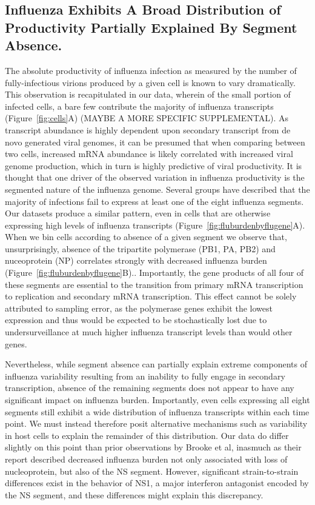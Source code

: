 \documentclass[9pt,lineno]{elife}
\begin{document}
\subsection{Influenza Exhibits A Broad Distribution of Productivity Partially Explained By Segment Absence.}
The absolute productivity of influenza infection as measured by the number of fully-infectious virions produced by a given cell is known to vary dramatically.  This observation is recapitulated in our data, wherein of the small portion of infected cells, a bare few contribute the majority of influenza transcripts (Figure~\ref{fig:cells}A) (MAYBE A MORE SPECIFIC SUPPLEMENTAL). As transcript abundance is highly dependent upon secondary transcript from de novo generated viral genomes, it can be presumed that when comparing between two cells, increased mRNA abundance is likely correlated with increased viral genome production, which in turn is highly predictive of viral productivity. It is thought that one driver of the observed variation in influenza productivity is the segmented nature of the influenza genome. Several groups have described that the majority of infections fail to express at least one of the eight influenza segments. Our datasets produce a similar pattern, even in cells that are otherwise expressing high levels of influenza transcripts (Figure~\ref{fig:fluburdenbyflugene}A). When we bin cells according to absence of a given segment we observe that, unsurprisingly, absence of the tripartite polymerase (PB1, PA, PB2) and nuceoprotein (NP) correlates strongly with decreased influenza burden (Figure~\ref{fig:fluburdenbyflugene}B).. Importantly, the gene products of all four of these segments are essential to the transition from primary mRNA transcription to replication and secondary mRNA transcription. This effect cannot be solely attributed to sampling error, as the polymerase genes exhibit the lowest expression and thus would be expected to be stochastically lost due to undersurveillance at much higher influenza transcript levels than would other genes. 

	Nevertheless, while segment absence can partially explain extreme components of influenza variability resulting from an inability to fully engage in secondary transcription, absence of the remaining segments does not appear to have any significant impact on influenza burden. Importantly, even cells expressing all eight segments still exhibit a wide distribution of influenza transcripts within each time point. We must instead therefore posit alternative mechanisms such as variability in host cells to explain the remainder of this distribution.  Our data do differ slightly on this point than prior observations by Brooke et al, inasmuch as their report described decreased influenza burden not only associated with loss of nucleoprotein, but also of the NS segment. However, significant strain-to-strain differences exist in the behavior of NS1, a major interferon antagonist encoded by the NS segment, and these differences might explain this discrepancy. 
\end{document}
